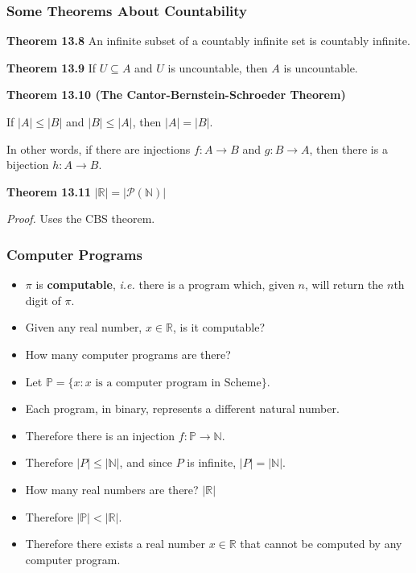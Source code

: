 \documentclass{beamer}
\newcommand{\nats}{\ensuremath{\mathbb{N}}}
\newcommand{\bfr}[1]{\begin{frame}[fragile]\frametitle{{ #1 }}}
\begin{document}
\bfr{Some Theorems About Countability}

{\bf Theorem 13.8} An infinite subset of a countably infinite set is
countably infinite.

\vfill

{\bf Theorem 13.9} If $U\subseteq A$ and $U$ is uncountable, then $A$
is uncountable.


\vfill

{\bf Theorem 13.10 (The Cantor-Bernstein-Schroeder Theorem)}

If $|A| \leq |B|$ and $|B|\leq |A|$, then $|A| = |B|$.

In other words, if there are injections $f:A\rightarrow B$ and
$g:B\rightarrow A$, then there is a bijection $h:A\rightarrow B$.

\vfill

{\bf Theorem 13.11}  $|\mathbb{R}| = |\mathcal{P}(\mathbb{N})|$

{\it Proof.}  Uses the CBS theorem.


\end{frame}

\bfr{Computer Programs}
\begin{itemize}
\item $\pi$ is {\bf computable}, {\em i.e.} there is a program
  which, given $n$, will return the $n$th digit of $\pi$.
  \pause
\item Given any real number, $x\in\mathbb{R}$, is it computable?
  \pause
\item How many computer programs are there?
\item Let $\mathbb{P} = \{ x : \mbox{$x$ is a computer program in Scheme}\}$.
  \pause
\item Each program, in binary, represents a different natural number.
  \pause
\item Therefore there is an injection $f : \mathbb{P} \rightarrow \nats$.
  \pause
\item Therefore $|P| \leq |\nats|$, and since $P$ is infinite, $|P| = |\nats|$.
  \pause
\item How many real numbers are there?  $|\mathbb{R}|$
  \pause
\item Therefore $|\mathbb{P}| < |\mathbb{R}|$.
  \pause
\item Therefore there exists a real number $x\in\mathbb{R}$
  that cannot be computed
  by any computer program.
\end{itemize}

\end{frame}
\end{document}
